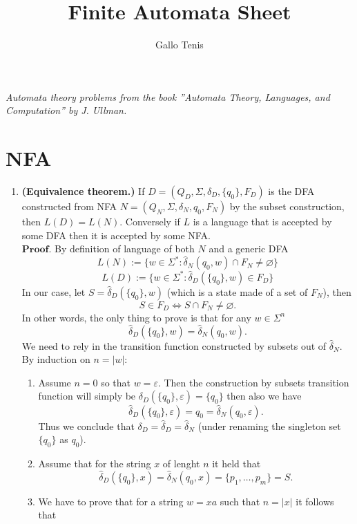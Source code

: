 \documentclass{article}
\title{Finite Automata Sheet}
\author{Gallo Tenis}
\newcommand{\D}{
    \hat{\delta}_{D}
}
\newcommand{\N}{
    \hat{\delta}_{N}
}
\newcommand{\DD}[2]{
    \hat{\delta}_{D}(\{#1\}, #2)
}
\newcommand{\NN}[2]{
    \hat{\delta}_{N}(#1, #2)
}
\theoremstyle{remark}
\begin{document}
\maketitle

\begin{center}
    \textit{
        Automata theory problems from the book ''Automata Theory, Languages, and Computation'' by J. Ullman.
    }
\end{center}
\section*{NFA}
\begin{enumerate}
    \item \textbf{(Equivalence theorem.)}
    If \( D = (Q_D, \Sigma, \delta_D, \{q_0\}, F_D) \) is the DFA constructed from NFA 
    \( N = (Q_N, \Sigma, \delta_N, q_0, F_N) \) by the subset construction, then \( L(D) = L(N) \).
    Conversely if $L$ is a language that is accepted by some DFA then it is accepted by some NFA.
    \\$\textbf{Proof.}$
    By definition of language of both $N$ and a generic DFA
    \[
    L(N) := \{w \in \Sigma^* : \hat{\delta}_N(q_0,w) \cap F_N \neq \varnothing\}
    \]
    \[
    L(D) := \{w \in \Sigma^* : \hat{\delta}_D(\{q_0\},w) \in F_D\}
    \]
    In our case, let $S = \DD{q_0}{w}$ (which is a state made of a set of $F_N$), then
    \[
    S \in F_D \iff S \cap F_N \neq \varnothing.
    \]
    In other words, the only thing to prove is that for any $w \in \Sigma^n$
    \[
        \DD{q_0}{w} = \NN{q_0}{w}.
    \]
    We need to rely in the transition function constructed by subsets out of $\N$.
    By induction on $n = \vert w \vert$:
    \begin{enumerate}
        \item[\textbf{Basis.}] Assume $n = 0$ so that $w = \varepsilon$. Then 
        the construction by subsets transition function will simply be $\delta_D(\{q_0\},\varepsilon) = \{q_0\}$ then 
        also we have
        \[
        \DD{q_0}{\varepsilon} = q_0 = \NN{q_0}{\varepsilon}.
        \]
        Thus we conclude that $\delta_D = \D = \N$ (under renaming the singleton set $\{q_0\}$ as $q_0$).
        \item[\textbf{Hypothesis.}] Assume that for the string $x$ of lenght $n$ it held that 
        \[
        \DD{q_0}{x} = \NN{q_0}{x} = \{p_1,\dots, p_m\} = S.
        \]
        \item[\textbf{Thesis.}] We have to prove that for a string $w = xa$ such that $n = \vert x\vert$ it follows that 

\end{enumerate}
\end{enumerate}
\end{document}
